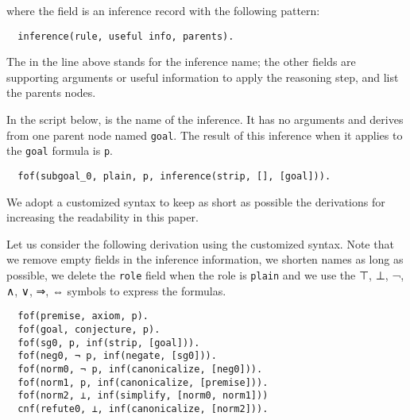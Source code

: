 \documentclass[../main.tex]{subfiles}
\begin{document}
where the  field is an inference record with the following
pattern:

\begin{verbatim}
  inference(rule, useful info, parents).
\end{verbatim}

The  in the line above stands for the inference name;
the other fields are supporting arguments or useful information to
apply the reasoning step, and list the parents nodes.

\begin{myexample}

In the script below, \strip is the name of the inference.
It has no arguments and derives from one parent node named  \verb!goal!. The
result of this inference when it applies to the \verb!goal! formula is
\verb!p!.

\begin{verbatim}
  fof(subgoal_0, plain, p, inference(strip, [], [goal])).
\end{verbatim}
\end{myexample}

\begin{notation}

We adopt a customized \TSTP syntax to keep as short as possible the \Metis
derivations for increasing the readability in this paper.

\begin{myexamplenum}
\label{fig:metis-example-tree}

Let us consider the following \TSTP derivation using
the customized \TSTP syntax. Note that we remove
empty fields in the inference information, we shorten names as long as possible, we delete the \verb!role! field when the role is
\verb!plain! and we use the ⊤, ⊥, ¬, ∧, ∨, ⇒, ⇔ symbols to express the formulas.

\begin{verbatim}
  fof(premise, axiom, p).
  fof(goal, conjecture, p).
  fof(sg0, p, inf(strip, [goal])).
  fof(neg0, ¬ p, inf(negate, [sg0])).
  fof(norm0, ¬ p, inf(canonicalize, [neg0])).
  fof(norm1, p, inf(canonicalize, [premise])).
  fof(norm2, ⊥, inf(simplify, [norm0, norm1]))
  cnf(refute0, ⊥, inf(canonicalize, [norm2])).
\end{verbatim}

\end{myexamplenum}
\end{notation}

\end{document}
